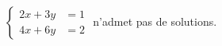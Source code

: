 $\begin{cases}2x+3y &= 1 \\ 4x+6y &= 2\end{cases}$ n'admet pas de solutions.

\begin{reponses}
\end{reponses}

